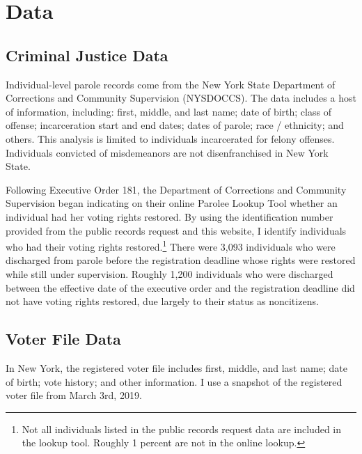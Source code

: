 \documentclass[
  12pt,
]{article}
\begin{document}
\hypertarget{data}{%
\section*{Data}\label{data}}

\hypertarget{criminal-justice-data}{%
\subsection*{Criminal Justice Data}\label{criminal-justice-data}}

Individual-level parole records come from the New York State Department of Corrections and Community Supervision (NYSDOCCS). The data includes a host of information, including: first, middle, and last name; date of birth; class of offense; incarceration start and end dates; dates of parole; race / ethnicity; and others. This analysis is limited to individuals incarcerated for felony offenses. Individuals convicted of misdemeanors are not disenfranchised in New York State.

Following Executive Order 181, the Department of Corrections and Community Supervision began indicating on their online Parolee Lookup Tool whether an individual had her voting rights restored. By using the identification number provided from the public records request and this website, I identify individuals who had their voting rights restored.\footnote{Not all individuals listed in the public records request data are included in the lookup tool. Roughly 1 percent are not in the online lookup.} There were 3,093 individuals who were discharged from parole before the registration deadline whose rights were restored while still under supervision. Roughly 1,200 individuals who were discharged between the effective date of the executive order and the registration deadline did not have voting rights restored, due largely to their status as noncitizens.

\hypertarget{voter-file-data}{%
\subsection*{Voter File Data}\label{voter-file-data}}

In New York, the registered voter file includes first, middle, and last name; date of birth; vote history; and other information. I use a snapshot of the registered voter file from March 3rd, 2019.
\end{document}
